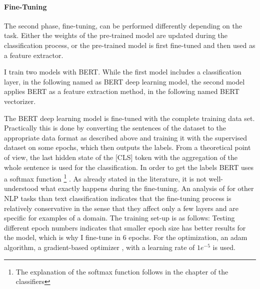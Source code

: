 \documentclass[12pt, a4paper, titlepage]{article}
\begin{document}
\paragraph{Fine-Tuning}
The second phase, fine-tuning, can be performed differently depending on the task. Either the weights of the pre-trained model are updated during the classification process, or the pre-trained model is first fine-tuned and then used as a feature extractor. 

I train two models with \ac{BERT}. While the first model includes a classification layer, in the following named as \ac{BERT} deep learning model, the second model applies \ac{BERT} as a feature extraction method, in the following named \ac{BERT} vectorizer. 

The \ac{BERT} deep learning model is fine-tuned with the complete training data set. Practically this is done by converting the sentences of the dataset to the appropriate data format as described above and training it with the supervised dataset on some epochs, which then outputs the labels. From a theoretical point of view, the last hidden state of the [CLS] token with the aggregation of the whole sentence is used for the classification. In order to get the labels \ac{BERT} uses a softmax function \footnote{The explanation of the softmax function follows in the chapter of the classifiers} \citep{sun2019}. As already stated in the literature, it is not well-understood what exactly happens during the fine-tuning. An analysis of \citet{merchant2020} for other NLP tasks than text classification indicates that the fine-tuning process is relatively conservative in the sense that they affect only a few layers and are specific for examples of a domain. The training set-up is as follows: Testing different epoch numbers indicates that smaller epoch size has better results for the model, which is why I fine-tune in 6 epochs. For the optimization, an adam algorithm, a gradient-based optimizer \citep{kingma2014}, with a learning rate of $1e^{-5}$ is used. 
\end{document}
